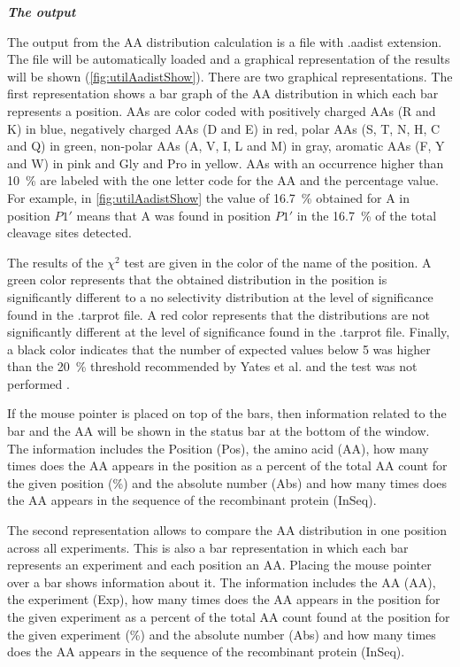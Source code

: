 \textit{\textbf{The output}} 

The output from the AA distribution calculation is a file with .aadist extension. The file will be automatically loaded and a graphical representation of the results will be shown (\autoref{fig:utilAadistShow}). There are two graphical representations. The first representation shows a bar graph of the AA distribution in which each bar represents a position. AAs are color coded with positively charged AAs (R and K) in blue, negatively charged AAs (D and E) in red, polar AAs (S, T, N, H, C and Q) in green, non-polar AAs (A, V, I, L and M) in gray, aromatic AAs (F, Y and W) in pink and Gly and Pro in yellow. AAs with an occurrence higher than \SI{10}{\percent} are labeled with the one letter code for the AA and the percentage value. For example, in \autoref{fig:utilAadistShow} the value of \SI{16.7}{\percent} obtained for A in position \(P1'\) means that A was found in position \(P1'\) in the \SI{16.7}{\percent} of the total cleavage sites detected. 

The results of the $\chi^2$ test are given in the color of the name of the position. A green color represents that the obtained distribution in the position is significantly different to a no selectivity distribution at the level of significance found in the .tarprot file. A red color represents that the distributions are not significantly different at the level of significance found in the .tarprot file. Finally, a black color indicates that the number of expected values below 5 was higher than the \SI{20}{\percent} threshold recommended by Yates et al. and the test was not performed \cite{Yates1999}. 

If the mouse pointer is placed on top of the bars, then information related to the bar and the AA will be shown in the status bar at the bottom of the window. The information includes the Position (Pos), the amino acid (AA), how many times does the AA appears in the position as a percent of the total AA count for the given position (\%) and the absolute number (Abs) and how many times does the AA appears in the sequence of the recombinant protein (InSeq).

The second representation allows to compare the AA distribution in one position across all experiments. This is also a bar representation in which each bar represents an experiment and each position an AA. Placing the mouse pointer over a bar shows information about it. The information includes the AA (AA), the experiment (Exp), how many times does the AA appears in the position for the given experiment as a percent of the total AA count found at the position for the given experiment (\%) and  the absolute number (Abs) and how many times does the AA appears in the sequence of the recombinant protein (InSeq).

